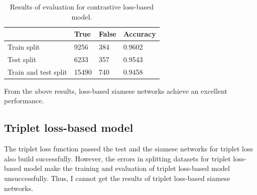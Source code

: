 \documentclass{article}
\begin{document}
\begin{table}[!ht]
\center

\begin{tabular}{llll}
\hline
            & True & False & Accuracy \\ \hline
Train split &  9256    &   384    & 0.9602        \\
Test split  &   6233   &    357   & 0.9543         \\
Train and test split   &  15490   &   740    &   0.9458       \\ \hline
\end{tabular}
\caption{Results of evaluation for contrastive loss-based model.}
\end{table}

From the above results, loss-based siamese networks achieve an excellent performance.


\subsection{Triplet loss-based model}

The triplet loss function passed the test and the siamese networks for triplet loss also build successfully. However, the errors in splitting datasets for triplet loss-based model make the training and evaluation of triplet loss-based model unsuccessfully. Thus, I cannot get the results of triplet loss-based siamese networks.



\end{document}
